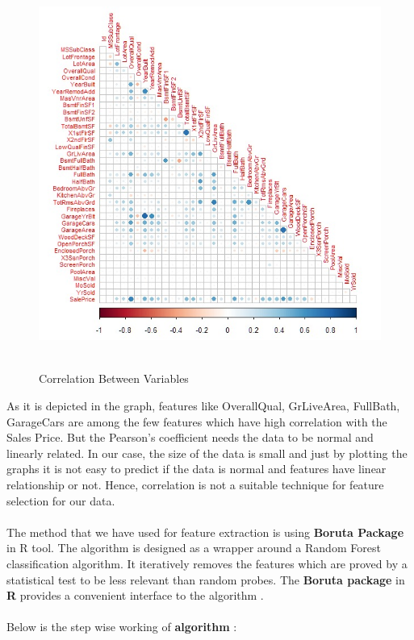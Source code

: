 \documentclass[fleqn,10pt]{SelfArx} %
\begin{document}
\begin{figure}[h]\centering
\includegraphics[scale=0.40]{Correlation}
\\ \caption{\\ Correlation Between Variables}
\end{figure}
As it is depicted in the graph, features like OverallQual, GrLiveArea, FullBath, GarageCars are among the few features which have high correlation with the Sales Price.
But the Pearson's coefficient needs the data to be normal and linearly related. In our case, the size of the data is small and just by plotting the graphs it is not easy to predict if the data is normal and features have linear relationship or not. Hence, correlation is not a suitable technique for feature selection for our data.
\\ \\ The method that we have used for feature extraction is using \textbf{Boruta Package} in R tool. The algorithm is designed as a wrapper around a Random Forest classification algorithm. It iteratively removes the features which are proved by a statistical test to be less relevant than random probes. The \textbf{Boruta package} in \textbf{R} provides a convenient interface to the algorithm \cite{REF:7}.
\\ \\Below is the step wise working of \textbf{algorithm} \cite{REF:6}:
\end{document}
